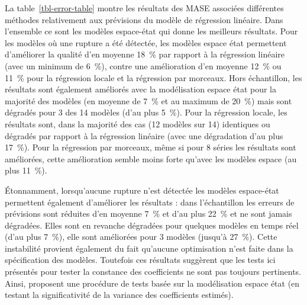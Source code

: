 \documentclass[
  a4paper,
  DIV=11,
  numbers=noendperiod,
  french]{scrartcl}
\newcommand\1{{\mathds 1}}
\theoremstyle{remark}
\begin{document}
La table~\ref{tbl-error-table} montre les résultats des MASE associées
différentes méthodes relativement aux prévisions du modèle de régression
linéaire. Dans l'ensemble ce sont les modèles espace-état qui donne les
meilleurs résultats. Pour les modèles où une rupture a été détectée, les
modèles espace état permettent d'améliorer la qualité d'en moyenne 18~\%
par rapport à la régression linéaire (avec un minimum de 6~\%), contre
une amélioration d'en moyenne 12~\% ou 11~\% pour la régression locale
et la régression par morceaux. Hors échantillon, les résultats sont
également améliorés avec la modélisation espace état pour la majorité
des modèles (en moyenne de 7~\% et au maximum de 20~\%) mais sont
dégradés pour 3 des 14 modèles (d'au plus 5~\%). Pour la régression
locale, les résultats sont, dans la majorité des cas (12 modèles sur 14)
identiques ou dégradés par rapport à la régression linéaire (avec une
dégradation d'au plus 17~\%). Pour la régression par morceaux, même si
pour 8 séries les résultats sont améliorées, cette amélioration semble
moins forte qu'avec les modèles espace (au plus 11~\%).

Étonnamment, lorsqu'aucune rupture n'est détectée les modèles
espace-état permettent également d'améliorer les résultats : dans
l'échantillon les erreurs de prévisions sont réduites d'en moyenne 7~\%
et d'au plus 22~\% et ne sont jamais dégradées. Elles sont en revanche
dégradées pour quelques modèles en temps réel (d'au plus 7~\%), elle
sont améliorées pour 3 modèles (jusqu'à 27~\%). Cette instabilité
provient également du fait qu'aucune optimisation n'est faite dans la
spécification des modèles. Toutefois ces résultats suggèrent que les
tests ici présentés pour tester la constance des coefficients ne sont
pas toujours pertinents. Ainsi, \textcite{abs2006} proposent une
procédure de tests basée sur la modélisation espace état (en testant la
significativité de la variance des coefficients estimés).
\end{document}
